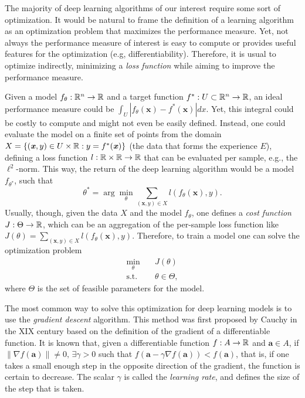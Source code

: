 The majority of deep learning algorithms of our interest require some sort of optimization.
It would be natural to frame the definition of a learning algorithm as an optimization problem that maximizes the performance measure.
Yet, not always the performance measure of interest is easy to compute or provides useful features for the optimization (e.g, differentiability).
Therefore, it is usual to optimize indirectly, minimizing a \textit{loss function} while aiming to improve the performance measure.

Given a model $f_\theta:\mathbb{R}^n\to\mathbb{R}$ and a target function $f^*:U\subset\mathbb{R}^n\to\mathbb{R}$, an ideal performance measure could be $\int_U |f_\theta(\bm{x}) - f^*(\bm{x})|dx$.
Yet, this integral could be costly to compute and might not even be easily defined.
Instead, one could evaluate the model on a finite set of points from the domain $X=\{(\textbf{\textit{x}},y)\in U\times\mathbb{R} : y=f^*(\textbf{\textit{x}})\}$ (the data that forms the experience $E$), defining a loss function $l:\mathbb{R}\times\mathbb{R}\to\mathbb{R}$ that can be evaluated per sample, e.g., the $\ell^2$-norm.
This way, the return of the deep learning algorithm would be a model $f_{\theta^*}$, such that \[
\theta^* = \arg\min_\theta \sum_{(\bm{x},y)\in X} l(f_\theta(\bm{x}), y)
.\] Usually, though, given the data $X$ and the model $f_\theta$, one defines a \emph{cost function} $J: \Theta\to\mathbb{R}$, which can be an aggregation of the per-sample loss function like $J\left( \theta \right) = \sum_{(\bm{x},y)\in X} l(f_\theta(\bm{x}), y)$.
Therefore, to train a model one can solve the optimization problem
\begin{align*}
    \min_\theta \quad & J\left( \theta \right)  \\
    \text{s.t.} \quad & \theta \in \Theta
,\end{align*}
where $\Theta$ is the set of feasible parameters for the model.

The most common way to solve this optimization for deep learning models is to use the \textit{gradient descent} algorithm.
This method was first proposed by Cauchy in the XIX century\cite{lemarechal_cauchy_2012} based on the definition of the gradient of a differentiable function.
It is known that, given a differentiable function $f:A\to\mathbb{R}$ and $\bm{a} \in A$, if $\| \nabla f(\bm{a}) \| \neq 0,\,\exists \gamma > 0$ such that $f(\bm{a} - \gamma \nabla f(\bm{a})) < f(\bm{a})$, that is, if one takes a small enough step in the opposite direction of the gradient, the function is certain to decrease.
The scalar $\gamma$ is called the \textit{learning rate}, and defines the size of the step that is taken\cite{goodfellow_deep_2016}.

